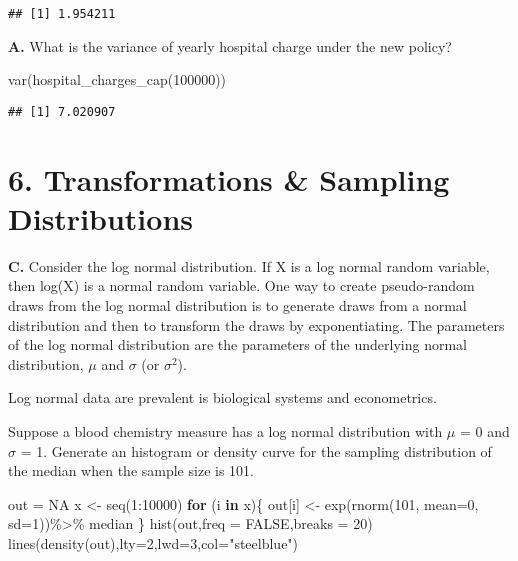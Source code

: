 \documentclass[
]{article}
\newenvironment{Shaded}{\begin{snugshade}}{\end{snugshade}}
\newcommand{\AttributeTok}[1]{\textcolor[rgb]{0.77,0.63,0.00}{#1}}
\newcommand{\ConstantTok}[1]{\textcolor[rgb]{0.00,0.00,0.00}{#1}}
\newcommand{\ControlFlowTok}[1]{\textcolor[rgb]{0.13,0.29,0.53}{\textbf{#1}}}
\newcommand{\DecValTok}[1]{\textcolor[rgb]{0.00,0.00,0.81}{#1}}
\newcommand{\FunctionTok}[1]{\textcolor[rgb]{0.00,0.00,0.00}{#1}}
\newcommand{\NormalTok}[1]{#1}
\newcommand{\OtherTok}[1]{\textcolor[rgb]{0.56,0.35,0.01}{#1}}
\newcommand{\SpecialCharTok}[1]{\textcolor[rgb]{0.00,0.00,0.00}{#1}}
\newcommand{\StringTok}[1]{\textcolor[rgb]{0.31,0.60,0.02}{#1}}
\begin{document}
\begin{verbatim}
## [1] 1.954211
\end{verbatim}

\textbf{A.} What is the variance of yearly hospital charge under the new
policy?

\begin{Shaded}
\begin{Highlighting}[]
\FunctionTok{var}\NormalTok{(}\FunctionTok{hospital\_charges\_cap}\NormalTok{(}\DecValTok{100000}\NormalTok{))}
\end{Highlighting}
\end{Shaded}

\begin{verbatim}
## [1] 7.020907
\end{verbatim}

\hypertarget{transformations-sampling-distributions}{%
\section{6. Transformations \& Sampling
Distributions}\label{transformations-sampling-distributions}}

\textbf{C.} Consider the log normal distribution. If X is a log normal
random variable, then log(X) is a normal random variable. One way to
create pseudo-random draws from the log normal distribution is to
generate draws from a normal distribution and then to transform the
draws by exponentiating. The parameters of the log normal distribution
are the parameters of the underlying normal distribution, \(\mu\) and
\(\sigma\) (or \(\sigma^2\)).

Log normal data are prevalent is biological systems and econometrics.

Suppose a blood chemistry measure has a log normal distribution with
\(\mu\) = 0 and \(\sigma\) = 1. Generate an histogram or density curve
for the sampling distribution of the median when the sample size is 101.

\begin{Shaded}
\begin{Highlighting}[]
\NormalTok{out }\OtherTok{=} \ConstantTok{NA}
\NormalTok{x }\OtherTok{\textless{}{-}} \FunctionTok{seq}\NormalTok{(}\DecValTok{1}\SpecialCharTok{:}\DecValTok{10000}\NormalTok{)}
\ControlFlowTok{for}\NormalTok{ (i }\ControlFlowTok{in}\NormalTok{ x)\{}
\NormalTok{  out[i] }\OtherTok{\textless{}{-}} \FunctionTok{exp}\NormalTok{(}\FunctionTok{rnorm}\NormalTok{(}\DecValTok{101}\NormalTok{, }\AttributeTok{mean=}\DecValTok{0}\NormalTok{, }\AttributeTok{sd=}\DecValTok{1}\NormalTok{))}\SpecialCharTok{\%\textgreater{}\%}\NormalTok{ median}
\NormalTok{\}}
\FunctionTok{hist}\NormalTok{(out,}\AttributeTok{freq =} \ConstantTok{FALSE}\NormalTok{,}\AttributeTok{breaks =} \DecValTok{20}\NormalTok{)}
\FunctionTok{lines}\NormalTok{(}\FunctionTok{density}\NormalTok{(out),}\AttributeTok{lty=}\DecValTok{2}\NormalTok{,}\AttributeTok{lwd=}\DecValTok{3}\NormalTok{,}\AttributeTok{col=}\StringTok{"steelblue"}\NormalTok{)}
\end{Highlighting}
\end{Shaded}
\end{document}
